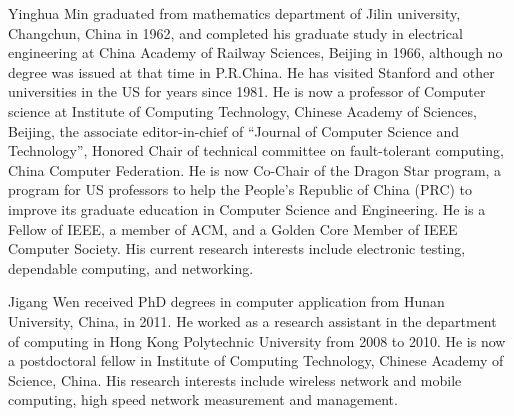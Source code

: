 \documentclass[10pt,journal,compsoc]{IEEEtran}
\begin{document}
\begin{IEEEbiography}{Yinghua Min} graduated from mathematics department of Jilin university, Changchun, China in 1962, and completed his graduate study in electrical engineering at China Academy of Railway Sciences, Beijing in 1966, although no degree was issued at that time in P.R.China.  He has visited Stanford and other universities in the US for years since 1981.  He is now a professor of Computer science at Institute of Computing Technology, Chinese Academy of Sciences, Beijing, the associate editor-in-chief of “Journal of Computer Science and Technology”, Honored Chair of technical committee on fault-tolerant computing, China Computer Federation.  He is now Co-Chair of the Dragon Star program, a program for US professors to help the People’s Republic of China (PRC) to improve its graduate education in Computer Science and Engineering. He is a Fellow of IEEE, a member of ACM, and a Golden Core Member of IEEE Computer Society.  His current research interests include electronic testing, dependable computing, and networking.
\end{IEEEbiography}
\begin{IEEEbiography}{Jigang Wen}
received PhD degrees in computer application from Hunan University, China, in 2011. He worked as a research assistant in the department of computing in Hong Kong Polytechnic University from 2008 to 2010. He is now a postdoctoral fellow
in Institute of Computing Technology, Chinese Academy of Science, China. His research interests include wireless network and mobile computing, high speed network measurement and management.
\end{IEEEbiography}
\end{document}
